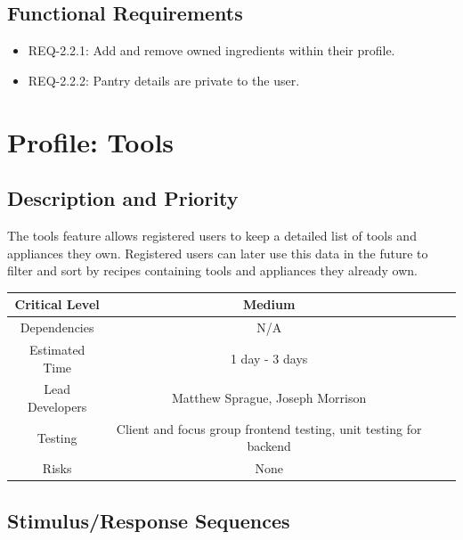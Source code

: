 \documentclass{scrreprt}
\begin{document}
\subsection{Functional Requirements}

\begin{itemize}
    \item REQ-2.2.1: Add and remove owned ingredients within their profile.
    \item REQ-2.2.2: Pantry details are private to the user.
\end{itemize}

\section{Profile: Tools}

\subsection{Description and Priority}

The tools feature allows registered users to keep a detailed list of tools and appliances they own. Registered users can later use this data in the future to filter and sort by recipes containing tools and appliances they already own.

\begin{center}
    \begin{tabular}{| c | c | c | c |}
        \hline
        Critical Level  & Medium                                                            \\
        \hline
        Dependencies    & N/A                                                               \\
        \hline
        Estimated Time  & 1 day - 3 days                                                    \\
        \hline
        Lead Developers & Matthew Sprague, Joseph Morrison                                  \\
        \hline
        Testing         & Client and focus group frontend testing, unit testing for backend \\
        \hline
        Risks           & None                                                              \\
        \hline
    \end{tabular}
\end{center}

\subsection{Stimulus/Response Sequences}
\end{document}
